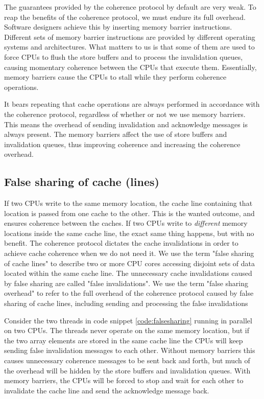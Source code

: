 The guarantees provided by the coherence protocol by default are very weak.
To reap the benefits of the coherence protocol, we must endure its full
overhead. Software designers achieve this by inserting memory barrier
instructions. Different sets of memory barrier instructions are provided by
different operating systems and architectures. What matters to us is that some
of them are used to force CPUs to flush the store buffers and to process the
invalidation queues, causing momentary coherence between the CPUs that execute
them. Essentially, memory barriers cause the CPUs to stall while they perform
coherence operations.

It bears repeating that cache operations are always performed in accordance with
the coherence protocol, regardless of whether or not we use memory barriers.
This means the overhead of sending invalidation and acknowledge messages is
always present. The memory barriers affect the use of store buffers and
invalidation queues, thus improving coherence and increasing the coherence
overhead.

\subsection{False sharing of cache (lines)}
If two CPUs write to the same memory location, the cache line containing that
location is passed from one cache to the other. This is the wanted outcome, and
ensures coherence between the caches. If two CPUs write to \textit{different}
memory locations inside the same cache line, the exact same thing happens, but
with no benefit. The coherence protocol dictates the cache invalidations in
order to achieve cache coherence when we do not need it. We use the term "false
sharing of cache lines" to describe two or more CPU cores accessing disjoint
sets of data located within the same cache line. The unnecessary cache
invalidations caused by false sharing are called "false invalidations". We use
the term "false sharing overhead" to refer to the full overhead of the coherence
protocol caused by false sharing of cache lines, including sending and
processing the false invalidations

Consider the two threads in code snippet \ref{code:falsesharing} running in
parallel on two CPUs. The threads never operate on the same memory location, but
if the two array elements are stored in the same cache line the CPUs will keep
sending false invalidation messages to each other. Without memory barriers this
causes unnecessary coherence messages to be sent back and forth, but much of the
overhead will be hidden by the store buffers and invalidation queues. With
memory barriers, the CPUs will be forced to stop and wait for each other to
invalidate the cache line and send the acknowledge message back.

